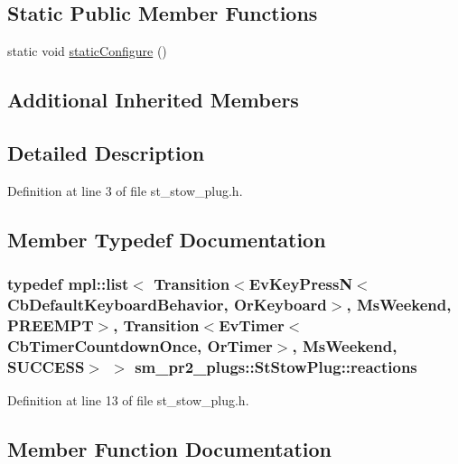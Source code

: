 \subsection*{Static Public Member Functions}
\begin{DoxyCompactItemize}
\item 
static void \hyperlink{structsm__pr2__plugs_1_1StStowPlug_a42733344b68d5558e349bf56db98efd6}{static\+Configure} ()
\end{DoxyCompactItemize}
\subsection*{Additional Inherited Members}


\subsection{Detailed Description}


Definition at line 3 of file st\+\_\+stow\+\_\+plug.\+h.



\subsection{Member Typedef Documentation}
\subsubsection[{\texorpdfstring{reactions}{reactions}}]{\setlength{\rightskip}{0pt plus 5cm}typedef mpl\+::list$<$ Transition$<$Ev\+Key\+PressN$<$Cb\+Default\+Keyboard\+Behavior, {\bf Or\+Keyboard}$>$, {\bf Ms\+Weekend}, {\bf P\+R\+E\+E\+M\+PT}$>$, Transition$<$Ev\+Timer$<$Cb\+Timer\+Countdown\+Once, {\bf Or\+Timer}$>$, {\bf Ms\+Weekend}, {\bf S\+U\+C\+C\+E\+SS}$>$ $>$ {\bf sm\+\_\+pr2\+\_\+plugs\+::\+St\+Stow\+Plug\+::reactions}}\hypertarget{structsm__pr2__plugs_1_1StStowPlug_ae6fc5bead24e3da64657c062438d35b0}{}\label{structsm__pr2__plugs_1_1StStowPlug_ae6fc5bead24e3da64657c062438d35b0}


Definition at line 13 of file st\+\_\+stow\+\_\+plug.\+h.



\subsection{Member Function Documentation}
